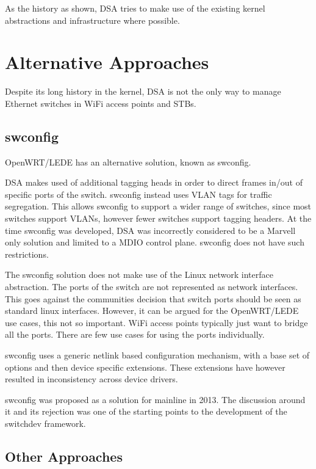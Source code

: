 \documentclass[letterpaper]{article}
\begin{document}
As the history as shown, DSA tries to make use of the existing kernel
abstractions and infrastructure where possible.

\section{Alternative Approaches}

Despite its long history in the kernel, DSA is not the only way to
manage Ethernet switches in WiFi access points and STBs.

\subsection{swconfig}

OpenWRT/LEDE has an alternative solution, known as swconfig.

DSA makes used of additional tagging heads in order to direct frames
in/out of specific ports of the switch. swconfig instead uses VLAN
tags for traffic segregation. This allows swconfig to support a wider
range of switches, since most switches support VLANs, however fewer
switches support tagging headers. At the time swconfig was developed,
DSA was incorrectly considered to be a Marvell only solution and
limited to a MDIO control plane. swconfig does not have such
restrictions.

The swconfig solution does not make use of the Linux network interface
abstraction. The ports of the switch are not represented as network
interfaces. This goes against the communities decision that switch
ports should be seen as standard linux interfaces. However, it can be
argued for the OpenWRT/LEDE use cases, this not so important. WiFi
access points typically just want to bridge all the ports. There are
few use cases for using the ports individually.

swconfig uses a generic netlink based configuration mechanism, with a
base set of options and then device specific extensions. These
extensions have however resulted in inconsistency across device
drivers.

swconfig was proposed as a solution for mainline in 2013. The
discussion around it and its rejection was one of the starting points
to the development of the switchdev framework.

\subsection{Other Approaches}
\end{document}

